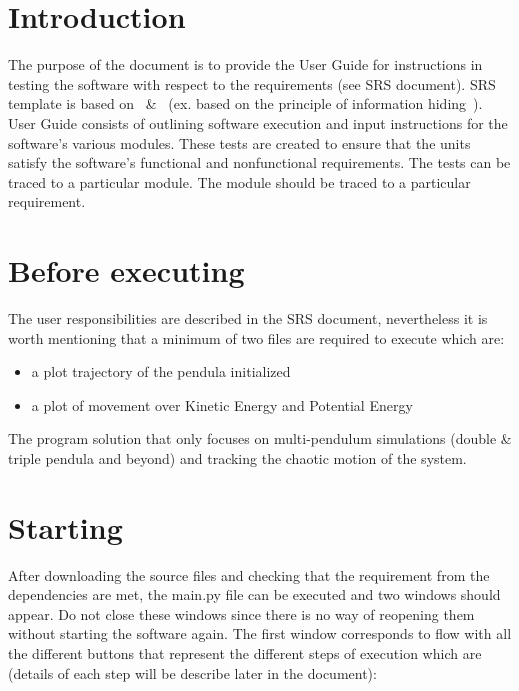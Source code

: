 \documentclass[12pt, titlepage]{article}
\begin{document}
\newpage

\tableofcontents

\listoftables %

\listoffigures %

\newpage


\section{Introduction}

The purpose of the document is to provide the User Guide
for instructions in testing the \progname{}software with 
respect to the requirements (see SRS document). SRS template is based 
on~\citep{SmithAndLai2005} \&~\citep{SmithEtAl2007}
(ex. based on the principle of information hiding~\citep{Parnas1972a}).
User Guide consists of outlining software execution and 
input instructions for the software's 
various modules. These tests are created to ensure that the units satisfy 
the software's functional and nonfunctional requirements. The tests can be 
traced to a particular module. The module should be traced to a particular 
requirement. 

\section{Before executing \progname{}}

The user responsibilities are described in the SRS document, nevertheless it 
is worth mentioning that a minimum of two files are required to execute 
\progname{} which are:
\begin{itemize}
\item a plot trajectory of the pendula initialized
\item a plot of movement over Kinetic Energy and Potential Energy
\end{itemize}
The \progname program solution that only focuses on multi-pendulum 
simulations (double \& triple pendula and beyond) and tracking the chaotic
motion of the system.

\section{Starting \progname{}}

After downloading the source files and checking that the requirement from the 
dependencies are met, the main.py file can be executed and two windows should 
appear. Do not close these windows since there is no way of reopening them 
without starting the software again. The first window %
corresponds to \progname{} flow with all the different buttons that represent 
the different steps of execution which are 
(details of each step will be describe later in the document):
\end{document}
